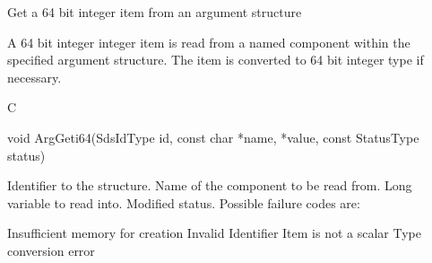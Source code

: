 \begin{manroutinedescription}
      Get a 64 bit integer item from an argument structure

      A 64 bit integer integer item is read from a named component within the
      specified argument structure. The item is converted to 64 bit integer
      type if necessary.
 
      C

      void ArgGeti64(SdsIdType id, const char *name, {} *value, %
const StatusType {\mantt{*}} status)
 
\begin{manparametertable}
 Identifier to the structure.
 Name of the component to be read %
from.
 Long variable to read %
into.
 Modified status. Possible %
failure codes are:
\end{manparametertable}
\begin{mantwocolumntable}
Insufficient memory for creation
Invalid Identifier
Item is not a scalar
Type conversion error
\end{mantwocolumntable}
\end{manroutinedescription}
